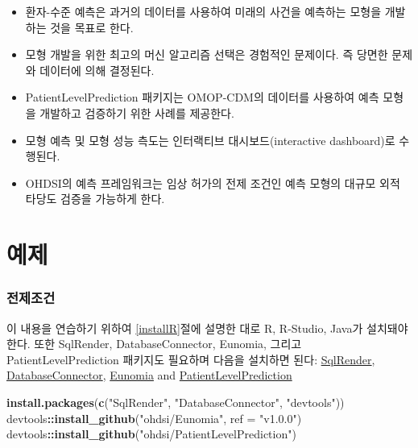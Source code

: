 \documentclass[11pt]{book}
\newenvironment{Shaded}{\begin{snugshade}}{\end{snugshade}}
\newcommand{\KeywordTok}[1]{\textcolor[rgb]{0.13,0.29,0.53}{\textbf{#1}}}
\newcommand{\DataTypeTok}[1]{\textcolor[rgb]{0.13,0.29,0.53}{#1}}
\newcommand{\StringTok}[1]{\textcolor[rgb]{0.31,0.60,0.02}{#1}}
\newcommand{\OperatorTok}[1]{\textcolor[rgb]{0.81,0.36,0.00}{\textbf{#1}}}
\newcommand{\NormalTok}[1]{#1}
\theoremstyle{definition}
\theoremstyle{definition}
\theoremstyle{definition}
\theoremstyle{remark}
\let\BeginKnitrBlock\begin \let\EndKnitrBlock\end
\begin{document}
\BeginKnitrBlock{rmdsummary}
\begin{itemize}
\item
  환자-수준 예측은 과거의 데이터를 사용하여 미래의 사건을 예측하는
  모형을 개발하는 것을 목표로 한다.
\item
  모형 개발을 위한 최고의 머신 알고리즘 선택은 경험적인 문제이다. 즉
  당면한 문제와 데이터에 의해 결정된다.
\item
  PatientLevelPrediction 패키지는 OMOP-CDM의 데이터를 사용하여 예측
  모형을 개발하고 검증하기 위한 사례를 제공한다.
\item
  모형 예측 및 모형 성능 측도는 인터랙티브 대시보드(interactive
  dashboard)로 수행된다.
\item
  OHDSI의 예측 프레임워크는 임상 허가의 전제 조건인 예측 모형의 대규모
  외적 타당도 검증을 가능하게 한다.
\end{itemize}
\EndKnitrBlock{rmdsummary}

\section{예제}\label{-7}

\subsubsection*{전제조건}\label{-6}

이 내용을 연습하기 위하여 \ref{installR}절에 설명한 대로 R, R-Studio,
Java가 설치돼야 한다. 또한 SqlRender, DatabaseConnector, Eunomia, 그리고
PatientLevelPrediction 패키지도 필요하며 다음을 설치하면 된다:
\href{https://ohdsi.github.io/SqlRender/}{SqlRender},
\href{https://ohdsi.github.io/DatabaseConnector/}{DatabaseConnector},
\href{https://ohdsi.github.io/Eunomia/}{Eunomia} and
\href{https://ohdsi.github.io/PatientLevelPrediction/}{PatientLevelPrediction}

\begin{Shaded}
\begin{Highlighting}[]
\KeywordTok{install.packages}\NormalTok{(}\KeywordTok{c}\NormalTok{(}\StringTok{"SqlRender"}\NormalTok{, }\StringTok{"DatabaseConnector"}\NormalTok{, }\StringTok{"devtools"}\NormalTok{))}
\NormalTok{devtools}\OperatorTok{::}\KeywordTok{install_github}\NormalTok{(}\StringTok{"ohdsi/Eunomia"}\NormalTok{, }\DataTypeTok{ref =} \StringTok{"v1.0.0"}\NormalTok{)}
\NormalTok{devtools}\OperatorTok{::}\KeywordTok{install_github}\NormalTok{(}\StringTok{"ohdsi/PatientLevelPrediction"}\NormalTok{)}
\end{Highlighting}
\end{Shaded}
\end{document}
